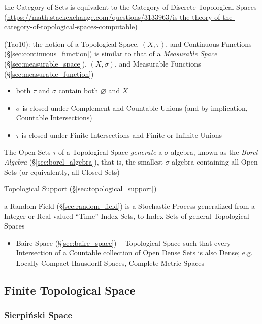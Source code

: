 the Category of Sets is equivalent to the Category of Discrete Topological
Spaces
(\url{https://math.stackexchange.com/questions/3133963/is-the-theory-of-the-category-of-topological-spaces-computable})

(Tao10):
the notion of a Topological Space, $(X,\tau)$, and Continuous Functions
(\S\ref{sec:continuous_function}) is similar to that of a \emph{Measurable
  Space} (\S\ref{sec:measurable_space}), $(X,\sigma)$, and Measurable Functions
(\S\ref{sec:measurable_function})
\begin{itemize}
  \item both $\tau$ and $\sigma$ contain both $\varnothing$ and $X$
  \item $\sigma$ is closed under Complement and Countable Unions (and
    by implication, Countable Intersections)
  \item $\tau$ is closed under Finite Intersections and Finite or Infinite
    Unions
\end{itemize}
The Open Sets $\tau$ of a Topological Space \emph{generate} a $\sigma$-algebra,
known as the \emph{Borel Algebra} (\S\ref{sec:borel_algebra}), that is, the
smallest $\sigma$-algebra containing all Open Sets (or equivalently, all Closed
Sets)

\fist Topological Support (\S\ref{sec:topological_support})

\fist a Random Field (\S\ref{sec:random_field}) is a Stochastic Process
generalized from a Integer or Real-valued ``Time'' Index Sets, to Index Sets of
general Topological Spaces

\asterism

\begin{itemize}
  \item Baire Space (\S\ref{sec:baire_space}) -- Topological Space such that
    every Intersection of a Countable collection of Open Dense Sets is also
    Dense; e.g. Locally Compact Hausdorff Spaces, Complete Metric Spaces
\end{itemize}



\subsection{Finite Topological Space}\label{sec:finite_topological_space}

\subsubsection{Sierpi\'nski Space}\label{sec:sierpinski_space}

